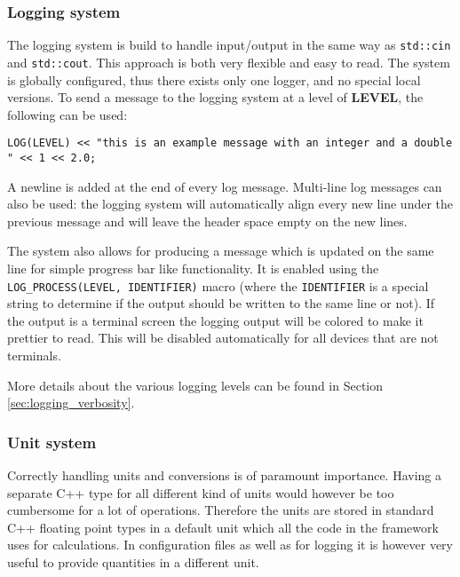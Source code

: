 \subsubsection{Logging system}
\label{sec:logger}
The logging system is build to handle input/output in the same way as \texttt{std::cin} and \texttt{std::cout}. This approach is both very flexible and easy to read. The system is globally configured, thus there exists only one logger, and no special local versions. To send a message to the logging system at a level of \textbf{LEVEL}, the following can be used:
\begin{verbatim}
LOG(LEVEL) << "this is an example message with an integer and a double " << 1 << 2.0;
\end{verbatim}
A newline is added at the end of every log message. Multi-line log messages can also be used: the logging system will automatically align every new line under the previous message and will leave the header space empty on the new lines. 

The system also allows for producing a message which is updated on the same line for simple progress bar like functionality. It is enabled using the \texttt{LOG\_PROCESS(LEVEL, IDENTIFIER)} macro (where the \texttt{IDENTIFIER} is a special string to determine if the output should be written to the same line or not). If the output is a terminal screen the logging output will be colored to make it prettier to read. This will be disabled automatically for all devices that are not terminals.

More details about the various logging levels can be found in Section \ref{sec:logging_verbosity}.

\subsubsection{Unit system}
\label{sec:unit_system}
Correctly handling units and conversions is of paramount importance. Having a separate C++ type for all different kind of units would however be too cumbersome for a lot of operations. Therefore the units are stored in standard C++ floating point types in a default unit which all the code in the framework uses for calculations. In configuration files as well as for logging it is however very useful to provide quantities in a different unit.

